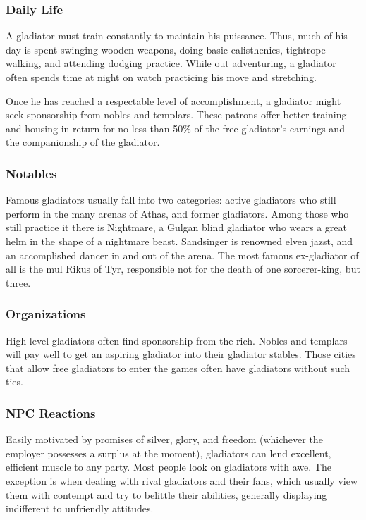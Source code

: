 \subsubsection{Daily Life}

A gladiator must train constantly to maintain his puissance. Thus, much of his day is spent swinging wooden weapons, doing basic calisthenics, tightrope walking, and attending dodging practice. While out adventuring, a gladiator often spends time at night on watch practicing his move and stretching.

Once he has reached a respectable level of accomplishment, a gladiator might seek sponsorship from nobles and templars. These patrons offer better training and housing in return for no less than 50\% of the free gladiator's earnings and the companionship of the gladiator.

\subsubsection{Notables}

Famous gladiators usually fall into two categories: active gladiators who still perform in the many arenas of Athas, and former gladiators. Among those who still practice it there is Nightmare, a Gulgan blind gladiator who wears a great helm in the shape of a nightmare beast. Sandsinger is renowned elven jazst, and an accomplished dancer in and out of the arena. The most famous ex-gladiator of all is the mul Rikus of Tyr, responsible not for the death of one sorcerer-king, but three.

\subsubsection{Organizations}

High-level gladiators often find sponsorship from the rich. Nobles and templars will pay well to get an aspiring gladiator into their gladiator stables. Those cities that allow free gladiators to enter the games often have gladiators without such ties.

\subsubsection{NPC Reactions}

Easily motivated by promises of silver, glory, and freedom (whichever the employer possesses a surplus at the moment), gladiators can lend excellent, efficient muscle to any party. Most people look on gladiators with awe. The exception is when dealing with rival gladiators and their fans, which usually view them with contempt and try to belittle their abilities, generally displaying indifferent to unfriendly attitudes.

